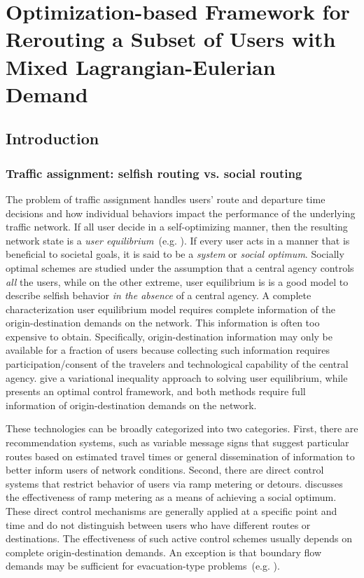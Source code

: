 \chapter{Optimization-based Framework for Rerouting a Subset of Users with Mixed Lagrangian-Eulerian Demand}
\label{chapter:le}

\section{Introduction}
\label{sec:le:introduction}


\subsection{Traffic assignment: selfish routing vs. social routing\label{sub:Traffic-assignment:-selfish}}

The problem of traffic assignment handles users' route and departure
time decisions and how individual behaviors impact the performance
of the underlying traffic network. If all user decide in a self-optimizing
manner, then the resulting network state is a \emph{user equilibrium}~(e.g.
\cite{wardrop1952some}). If every user acts in a manner that
is beneficial to societal goals, it is said to be a \emph{system}
or \emph{social optimum}. Socially optimal schemes are studied under
the assumption that a central agency controls \emph{all }the users,
while on the other extreme, user equilibrium is is a good model to
describe selfish behavior \emph{in the absence} of a central agency.
A complete characterization user equilibrium model requires complete
information of the origin-destination demands on the network. This
information is often too expensive to obtain. Specifically, origin-destination
information may only be available for a fraction of users because
collecting such information requires participation/consent of the
travelers and technological capability of the central agency. \cite{lo2002cell}
give a variational inequality approach to solving user equilibrium,
while \cite{papageogiou1990} presents an optimal control framework,
and both methods require full information of origin-destination demands
on the network.

These technologies can be broadly categorized into two categories.
First, there are recommendation systems, such as variable message
signs that suggest particular routes based on estimated travel times
or general dissemination of information to better inform users of
network conditions. Second, there are direct control systems that
restrict behavior of users via ramp metering or detours. \cite{gomes2008behavior}
discusses the effectiveness of ramp metering as a means of achieving
a social optimum. These direct control mechanisms are generally applied
at a specific point and time and do not distinguish between users
who have different routes or destinations. The effectiveness of such
active control schemes usually depends on complete origin-destination
demands. An exception is that boundary flow demands may be sufficient
for evacuation-type problems~(e.g. \cite{ziliaskopoulos2000linear}).


